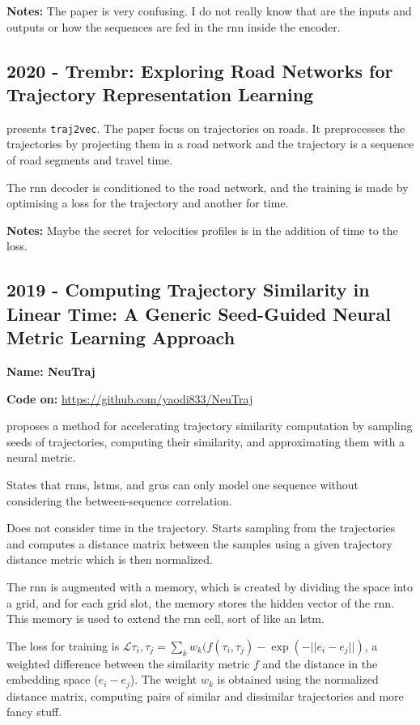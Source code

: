 \textbf{Notes:} The paper is very confusing. I do not really know that are the inputs and outputs or how the sequences are fed in the \gls{rnn} inside the encoder.


\subsection*{2020 - Trembr: Exploring Road Networks for Trajectory Representation Learning}

\cite{fu2020trembr} presents \texttt{traj2vec}. The paper focus on trajectories on roads. It preprocesses the trajectories by projecting them in a road network and the trajectory is a sequence of road segments and travel time.

The \gls{rnn} decoder is conditioned to the road network, and the training is made by optimising a loss for the trajectory and another for time.

\textbf{Notes:} Maybe the secret for velocities profiles is in the addition of time to the loss.

\subsection*{2019 - Computing Trajectory Similarity in Linear Time: A Generic Seed-Guided Neural Metric Learning Approach}

\textbf{Name: NeuTraj}

\textbf{Code on:} \url{https://github.com/yaodi833/NeuTraj}

\cite{yao2019computing} proposes a method for accelerating trajectory similarity computation by sampling seeds of trajectories, computing their similarity, and approximating them with a neural metric.

States that \glspl{rnn}, \glspl{lstm}, and \glspl{gru} can only  model one sequence without considering the between-sequence correlation.

Does not consider time in the trajectory. Starts sampling from the trajectories and computes a distance matrix between the samples using a given trajectory distance metric which is then normalized.

The \gls{rnn} is augmented with a memory, which is created by dividing the space into a grid, and for each grid slot, the memory stores the hidden vector of the \gls{rnn}. This memory is used to extend the \gls{rnn} cell, sort of like an \gls{lstm}.

The loss for training is $\mathcal{L}{\tau_i, \tau_j}=\sum_k w_k(f(\tau_i, \tau_j)-\exp(-||e_i-e_j||)$, a weighted difference between the similarity metric $f$ and the distance in the embedding space ($e_i-e_j$). The weight $w_k$ is obtained using the normalized distance matrix, computing pairs of similar and dissimilar trajectories and more fancy stuff.

